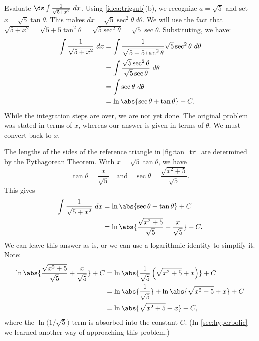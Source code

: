 \begin{example}\label{ex_trigsub3}
Evaluate $\ds \int \frac{1}{\sqrt{5+x^2}}\ dx$.
\solution
Using \autoref{idea:trigsub}(b), we recognize $a=\sqrt{5}$ and  set $x= \sqrt{5}\tan \theta$. This makes $dx = \sqrt{5}\sec^2\theta\ d\theta$. We will use the fact that $\sqrt{5+x^2} = \sqrt{5+5\tan^2\theta} = \sqrt{5\sec^2\theta} = \sqrt{5}\sec\theta.$ Substituting, we have:
\begin{align*}
\int \frac{1}{\sqrt{5+x^2}}\ dx &= \int \frac{1}{\sqrt{5+5\tan^2\theta}}\sqrt{5}\sec^2\theta\ d\theta \\
			&= \int \frac{\sqrt{5}\sec^2\theta}{\sqrt{5}\sec\theta} \ d\theta\\
			&= \int \sec\theta\ d\theta\\
			&= \ln\abs{\sec\theta+\tan\theta}+C.
\end{align*}
While the integration steps are over, we are not yet done. The original problem was stated in terms of $x$, whereas our answer is given in terms of $\theta$. We must convert back to $x$.

The lengths of the sides of the reference triangle in \autoref{fig:tan_tri} are determined by the Pythagorean Theorem. With $x=\sqrt{5}\tan\theta$, we have 
\[\tan \theta = \frac x{\sqrt{5}}\quad \text{and}\quad \sec\theta = \frac{\sqrt{x^2+5}}{\sqrt{5}}.\]
This gives
\begin{align*}
	\int\frac1{\sqrt{5+x^2}}\ dx
	&= \ln\abs{\sec\theta+\tan\theta}+C \\
	&= \ln\abs{\frac{\sqrt{x^2+5}}{\sqrt5}+ \frac x{\sqrt5}}+C.
\end{align*}
We can leave this answer as is, or we can use a logarithmic identity to simplify it. Note:
\begin{align*}
	\ln\abs{\frac{\sqrt{x^2+5}}{\sqrt5}+ \frac x{\sqrt5}}+C
	&= \ln\abs{\frac1{\sqrt5}\left(\sqrt{x^2+5}+ x\right)}+C \\
	&= \ln\abs{\frac1{\sqrt5}} + \ln\abs{\sqrt{x^2+5}+ x}+C\\
	&=	\ln\abs{\sqrt{x^2+5}+ x}+C,
\end{align*}
where the $\ln\bigl(1/\sqrt5\bigr)$ term is absorbed into the constant $C$. (In \autoref{sec:hyperbolic} we learned another way of approaching this problem.)
\end{example}

